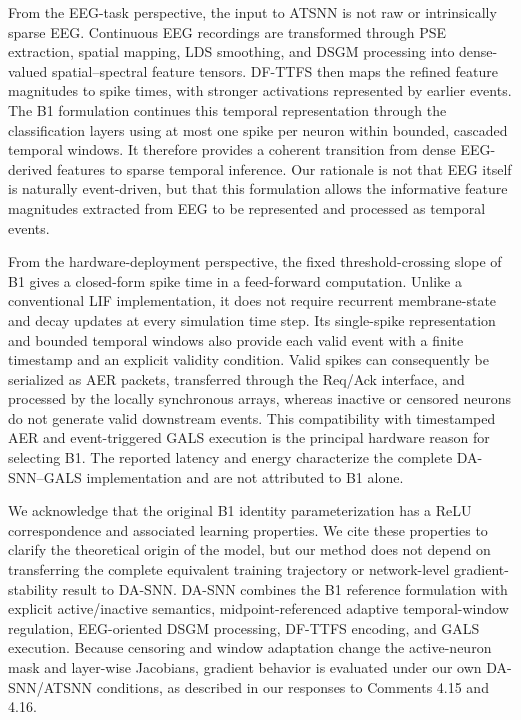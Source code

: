 \documentclass[12pt,technote,onecolumn]{IEEEtran}
\begin{document}
From the EEG-task perspective, the input to ATSNN is not raw or
intrinsically sparse EEG. Continuous EEG recordings are transformed
through PSE extraction, spatial mapping, LDS smoothing, and DSGM
processing into dense-valued spatial--spectral feature tensors. DF-TTFS
then maps the refined feature magnitudes to spike times, with stronger
activations represented by earlier events. The B1 formulation continues
this temporal representation through the classification layers using at
most one spike per neuron within bounded, cascaded temporal windows. It
therefore provides a coherent transition from dense EEG-derived features
to sparse temporal inference. Our rationale is not that EEG itself is
naturally event-driven, but that this formulation allows the informative
feature magnitudes extracted from EEG to be represented and processed as
temporal events.

From the hardware-deployment perspective, the fixed threshold-crossing
slope of B1 gives a closed-form spike time in a feed-forward computation.
Unlike a conventional LIF implementation, it does not require recurrent
membrane-state and decay updates at every simulation time step. Its
single-spike representation and bounded temporal windows also provide
each valid event with a finite timestamp and an explicit validity
condition. Valid spikes can consequently be serialized as AER packets,
transferred through the Req/Ack interface, and processed by the locally
synchronous arrays, whereas inactive or censored neurons do not generate
valid downstream events. This compatibility with timestamped AER and
event-triggered GALS execution is the principal hardware reason for
selecting B1. The reported latency and energy characterize the complete
DA-SNN--GALS implementation and are not attributed to B1 alone.

We acknowledge that the original B1 identity parameterization has a ReLU
correspondence and associated learning properties. We cite these
properties to clarify the theoretical origin of the model, but our method
does not depend on transferring the complete equivalent training
trajectory or network-level gradient-stability result to DA-SNN. DA-SNN
combines the B1 reference formulation with explicit active/inactive
semantics, midpoint-referenced adaptive temporal-window regulation,
EEG-oriented DSGM processing, DF-TTFS encoding, and GALS execution.
Because censoring and window adaptation change the active-neuron mask and
layer-wise Jacobians, gradient behavior is evaluated under our own
DA-SNN/ATSNN conditions, as described in our responses to Comments 4.15
and 4.16.
\end{document}
